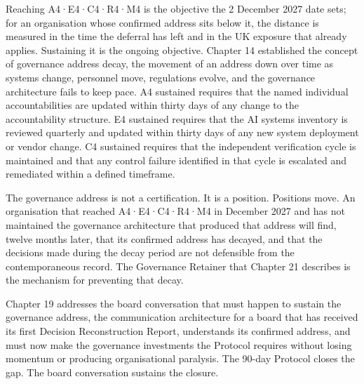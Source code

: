 Reaching A4·E4·C4·R4·M4 is the objective the 2 December 2027 date sets; for an organisation whose confirmed address sits below it, the distance is measured in the time the deferral has left and in the UK exposure that already applies. Sustaining it is the ongoing objective. Chapter 14 established the concept of governance address decay, the movement of an address down over time as systems change, personnel move, regulations evolve, and the governance architecture fails to keep pace. A4 sustained requires that the named individual accountabilities are updated within thirty days of any change to the accountability structure. E4 sustained requires that the AI systems inventory is reviewed quarterly and updated within thirty days of any new system deployment or vendor change. C4 sustained requires that the independent verification cycle is maintained and that any control failure identified in that cycle is escalated and remediated within a defined timeframe.

The governance address is not a certification. It is a position. Positions move. An organisation that reached A4·E4·C4·R4·M4 in December 2027 and has not maintained the governance architecture that produced that address will find, twelve months later, that its confirmed address has decayed, and that the decisions made during the decay period are not defensible from the contemporaneous record. The Governance Retainer that Chapter 21 describes is the mechanism for preventing that decay.

Chapter 19 addresses the board conversation that must happen to sustain the governance address, the communication architecture for a board that has received its first Decision Reconstruction Report, understands its confirmed address, and must now make the governance investments the Protocol requires without losing momentum or producing organisational paralysis. The 90-day Protocol closes the gap. The board conversation sustains the closure.
